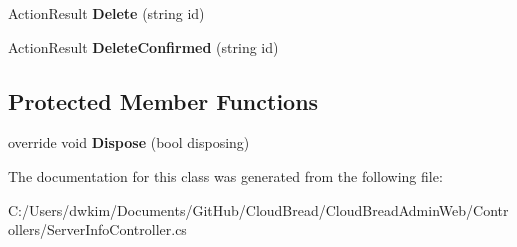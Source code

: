 \begin{DoxyCompactItemize}
\item 
Action\+Result {\bfseries Delete} (string id)\hypertarget{a00179_a09a9ce8007e1527562cc61b9456b0399}{}\label{a00179_a09a9ce8007e1527562cc61b9456b0399}

\item 
Action\+Result {\bfseries Delete\+Confirmed} (string id)\hypertarget{a00179_ad5c65a60ec3425e0afec0bcc31653bc1}{}\label{a00179_ad5c65a60ec3425e0afec0bcc31653bc1}

\end{DoxyCompactItemize}
\subsection*{Protected Member Functions}
\begin{DoxyCompactItemize}
\item 
override void {\bfseries Dispose} (bool disposing)\hypertarget{a00179_acb79d1d916950d297524b6a7c1240771}{}\label{a00179_acb79d1d916950d297524b6a7c1240771}

\end{DoxyCompactItemize}


The documentation for this class was generated from the following file\+:\begin{DoxyCompactItemize}
\item 
C\+:/\+Users/dwkim/\+Documents/\+Git\+Hub/\+Cloud\+Bread/\+Cloud\+Bread\+Admin\+Web/\+Controllers/Server\+Info\+Controller.\+cs\end{DoxyCompactItemize}
